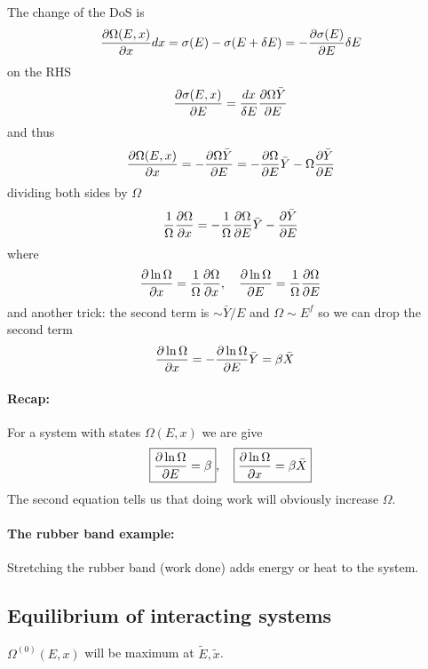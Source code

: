 \documentclass[../main.tex]{subfiles}
\begin{document}
The change of the DoS is
\begin{align*}
    \pdv{\Omega(E,x)}{x} dx = \sigma(E) - \sigma(E + \delta E) = -\pdv{\sigma(E)}{E} \delta E
\end{align*}
on the RHS
\begin{align*}
    \pdv{\sigma(E,x)}{E} = \frac{dx}{\delta E} \pdv{\Omega \bar Y}{E}
\end{align*}
and thus
\begin{align*}
    \pdv{\Omega(E,x)}{x} = -\pdv{\Omega \bar Y}{E} = -\pdv{\Omega}{E} \bar Y - \Omega \pdv{\bar Y}{E}
\end{align*}
dividing both sides by $\Omega$
\begin{align*}
    \frac{1}{\Omega} \pdv{\Omega}{x} = -\frac{1}{\Omega} \pdv{\Omega}{E} \bar Y - \pdv{\bar Y}{E}
\end{align*}
where
\begin{align*}
    \pdv{\ln \Omega}{x} = \frac{1}{\Omega} \pdv{\Omega}{x}, \quad \pdv{\ln \Omega}{E} = \frac{1}{\Omega} \pdv{\Omega}{E}
\end{align*}
and another trick: the second term is $\sim\bar Y / E$ and $\Omega \sim E^f$ so we can drop the second term
\begin{align*}
    \pdv{\ln \Omega}{x} &= -\pdv{\ln \Omega}{E} \bar Y = \beta \bar X
\end{align*}

\paragraph{Recap:}
For a system with states $\Omega(E,x)$ we are give
\begin{align*}
    \boxed{\pdv{\ln \Omega}{E} = \beta}, \quad \boxed{\pdv{\ln \Omega}{x} = \beta \bar X}
\end{align*}
The second equation tells us that doing work will obviously increase $\Omega$.

\paragraph{The rubber band example:}
Stretching the rubber band (work done) adds energy or heat to the system.

\subsection{Equilibrium of interacting systems}

$\Omega^{(0)} (E,x)$ will be maximum at $\tilde E, \tilde x$.
\end{document}
